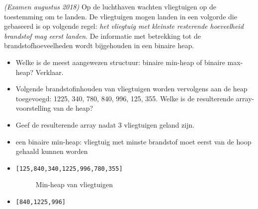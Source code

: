 \begin{oef}
\papier \emph{(Examen augustus 2018)} Op de luchthaven wachten vliegtuigen op de toestemming om te landen. De vliegtuigen mogen landen in een volgorde die gebaseerd is op volgende regel: \emph{het vliegtuig met kleinste resterende hoeveelheid brandstof mag eerst landen}. De informatie met betrekking tot de brandstofhoeveelheden wordt bijgehouden in een binaire heap.

\begin{itemize}	
\item Welke is de meest aangewezen structuur: binaire min-heap of binaire max-heap?
Verklaar.




\item Volgende brandstofinhouden van vliegtuigen worden vervolgens aan de heap toegevoegd:
1225, 340, 780, 840, 996, 125, 355. Welke is de resulterende array-voorstelling van de heap?


\item Geef de resulterende array nadat 3 vliegtuigen geland zijn.

\end{itemize}	
\begin{opl}
\begin{itemize}
\item een binaire min-heap: vliegtuig met minste brandstof moet eerst van de hoop gehaald kunnen worden
\item \verb/[125,840,340,1225,996,780,355]/

\begin{figure}[htbp]
    \centering
{}
\caption{Min-heap van vliegtuigen}
\end{figure}
\item \verb/[840,1225,996]/
\end{itemize}
\end{opl}
\end{oef}


